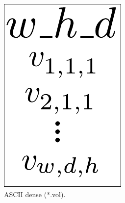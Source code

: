 \begin{figure}[htpb!]
        \centering
        \begin{subfigure}[t]{0.16\textwidth}
                \includegraphics[width=\textwidth]{img/file_format_ascii_dense}
                \caption{ASCII dense (*.vol).}
                \label{fig:file_format_ascii_dense}
        \end{subfigure}%
        ~ %
        \begin{subfigure}[t]{0.24\textwidth}

\end{subfigure}
\end{figure}
